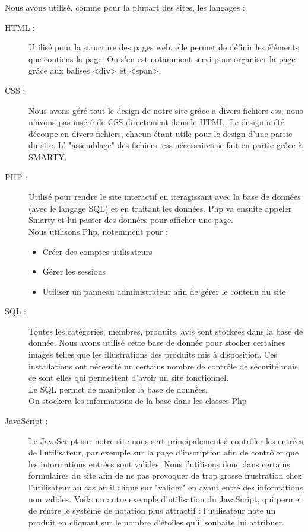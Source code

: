 Nous avons utilisé, comme pour la plupart des sites, les langages :
\begin{description}
	\item[HTML :] Utilisé pour la structure des pages web, elle permet de définir les éléments que contiens la page. On s'en est notamment servi pour organiser la page grâce aux balises <div> et <span>.
	
	\item[CSS :] Nous avons géré tout le design de notre site grâce a divers fichiers css, nous n'avons pas inséré de CSS directement dans le HTML.
Le design a été découpe en divers fichiers, chacun étant utile pour le design d'une partie du site. L' "assemblage" des fichiers .css nécessaires
se fait en partie grâce à SMARTY.
	
	\item[PHP :] Utilisé pour rendre le site interactif en iteragissant avec la base de données (avec le langage SQL) et en traitant les données.
	Php va ensuite appeler Smarty et lui passer des données pour afficher une page.\\
	Nous utilisons Php, notemment pour :
	\begin{itemize}
		\item Créer des comptes utilisateurs
		\item Gérer les sessions
		\item Utiliser un panneau administrateur afin de gérer le contenu du site
	\end{itemize}
	
	\item[SQL :] Toutes les catégories, membres, produits, avis sont stockées dans la base de donnée. Nous avons utilisé cette base de donnée pour stocker certaines images telles que les illustrations des produits mis à disposition. Ces installations ont nécessité un certains nombre de contrôle de sécurité mais 	ce sont elles qui permettent d'avoir un site fonctionnel.\\
	Le SQL permet de manipuler la base de données.\\
	On stockera les informations de la base dans les classes Php
	
	\item[JavaScript :] Le JavaScript sur notre site nous sert principalement à contrôler les entrées de l'utilisateur, par exemple sur la page d'inscription afin de contrôler que les informations entrées sont valides.
Nous l'utilisons donc dans certains formulaires du site afin de ne pas provoquer de trop grosse frustration chez l'utilisateur au cas ou il clique sur "valider"
en ayant entré des informations non valides.
Voila un autre exemple d'utilisation du JavaScript, qui permet de rentre le système de notation plus attractif : l'utilisateur note un produit en cliquant sur le
nombre d'étoiles qu'il souhaite lui attribuer.

\end{description}